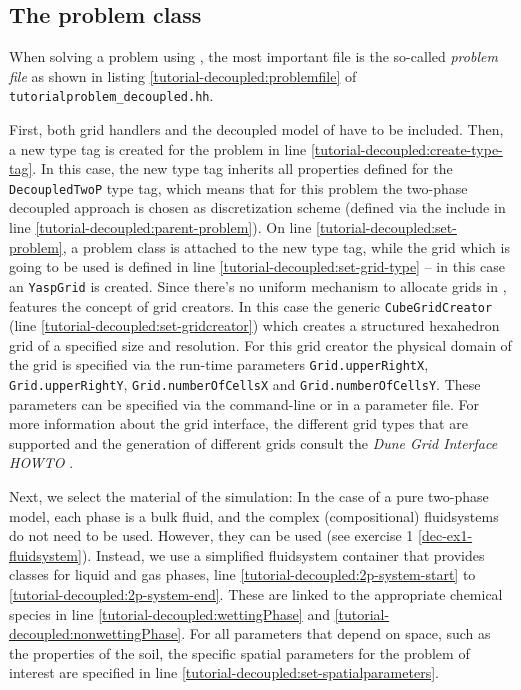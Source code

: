\subsection{The problem class} \label{decoupled_problem}

When solving a problem using \Dumux, the most important file is the
so-called \textit{problem file} as shown in listing
\ref{tutorial-decoupled:problemfile} of
\texttt{tutorialproblem\_decoupled.hh}.

\begin{lst}\label{tutorial-decoupled:problemfile} \mbox{}

\end{lst}

First, both \Dune  grid handlers and the decoupled model of \Dumux 
have to be included. Then, a new type tag is created for the problem 
in line \ref{tutorial-decoupled:create-type-tag}.  In this case, the 
new type tag inherits all properties defined for the \texttt{DecoupledTwoP} 
type tag, which means that for this problem the two-phase decoupled approach
is chosen as discretization scheme (defined via the include in line 
\ref{tutorial-decoupled:parent-problem}). On line \ref{tutorial-decoupled:set-problem}, 
a problem class is attached to the new type tag, while the grid which
is going to be used is defined in line \ref{tutorial-decoupled:set-grid-type} --
in this case an \texttt{YaspGrid} is created. Since there's no uniform mechanism to
allocate grids in \Dune, \Dumux features the concept of grid creators.
In this case the generic \texttt{CubeGridCreator} (line \ref{tutorial-decoupled:set-gridcreator}) which creates a
structured hexahedron grid of a specified size and resolution. For
this grid creator the  physical domain of the grid is specified via the
run-time parameters \texttt{Grid.upperRightX},
\texttt{Grid.upperRightY}, \texttt{Grid.numberOfCellsX} and
\texttt{Grid.numberOfCellsY}. These parameters can be specified via
the command-line or in a parameter file.
For more information about the \Dune grid interface, the different grid types 
that are supported and the generation of different grids consult 
the \textit{Dune Grid Interface HOWTO} \cite{DUNE-HP}. 

Next, we select the material of the simulation: In the case of a pure two-phase
model, each phase is a bulk fluid, and the complex (compositional) fluidsystems
do not need to be used. However, they can be used (see exercise 1 \ref{dec-ex1-fluidsystem}). 
Instead, we use a simplified fluidsystem container that provides classes 
for liquid and gas phases, line \ref{tutorial-decoupled:2p-system-start} to 
\ref{tutorial-decoupled:2p-system-end}. These are linked to the appropriate 
chemical species in line \ref{tutorial-decoupled:wettingPhase} and 
\ref{tutorial-decoupled:nonwettingPhase}. For all parameters that depend 
on space, such as the properties of the soil, the specific spatial parameters 
for the problem of interest are specified in line
\ref{tutorial-decoupled:set-spatialparameters}. 

